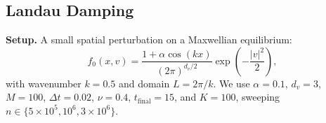 \documentclass[]{article}
\numberwithin{equation}{section}
\begin{document}
\subsection{Landau Damping}
\label{sec:landau}

\textbf{Setup.}  A small spatial perturbation on a Maxwellian equilibrium:
\begin{equation}
f_0(x, v) = \frac{1 + \alpha \cos(kx)}{(2\pi)^{d_v/2}} \exp\!\left(-\frac{|v|^2}{2}\right),
\end{equation}
with wavenumber $k = 0.5$ and domain $L = 2\pi/k$.  We use $\alpha = 0.1$, $d_v = 3$, $M = 100$, $\Delta t = 0.02$, $\nu = 0.4$, $t_{\mathrm{final}} = 15$, and $K = 100$, sweeping $n \in \{5 \times 10^5, 10^6, 3 \times 10^6\}$. 


\end{document}
